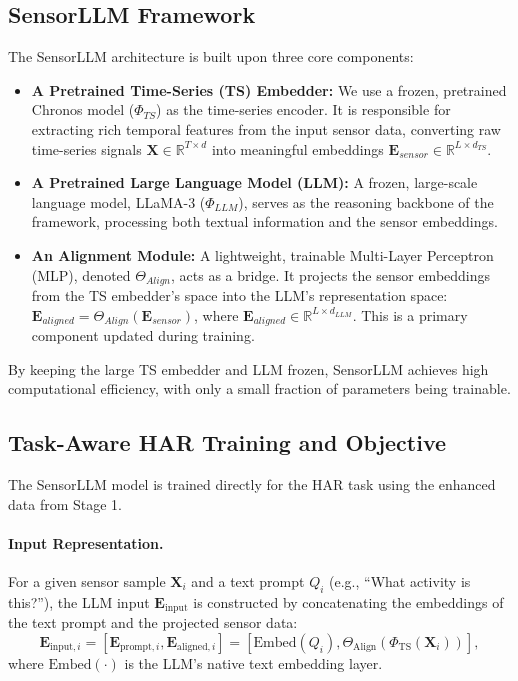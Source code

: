 \subsection{SensorLLM Framework}
\hspace{2em}The SensorLLM architecture is built upon three core components:
\begin{itemize}
    \item \textbf{A Pretrained Time-Series (TS) Embedder:} We use a frozen, pretrained Chronos model ($\Phi_{TS}$) as the time-series encoder. It is responsible for extracting rich temporal features from the input sensor data, converting raw time-series signals $\mathbf{X} \in \mathbb{R}^{T \times d}$ into meaningful embeddings $\mathbf{E}_{sensor} \in \mathbb{R}^{L \times d_{TS}}$.
    \item \textbf{A Pretrained Large Language Model (LLM):} A frozen, large-scale language model, LLaMA-3 ($\Phi_{LLM}$), serves as the reasoning backbone of the framework, processing both textual information and the sensor embeddings.
    \item \textbf{An Alignment Module:} A lightweight, trainable Multi-Layer Perceptron (MLP), denoted $\Theta_{Align}$, acts as a bridge. It projects the sensor embeddings from the TS embedder's space into the LLM's representation space: $\mathbf{E}_{aligned} = \Theta_{Align}(\mathbf{E}_{sensor})$, where $\mathbf{E}_{aligned} \in \mathbb{R}^{L \times d_{LLM}}$. This is a primary component updated during training.
\end{itemize}
By keeping the large TS embedder and LLM frozen, SensorLLM achieves high computational efficiency, with only a small fraction of parameters being trainable.

\subsection{Task-Aware HAR Training and Objective}
\hspace{2em}The SensorLLM model is trained directly for the HAR task using the enhanced data from Stage 1.

\paragraph{Input Representation.} For a given sensor sample $\mathbf{X}_i$ and a text prompt $Q_i$ (e.g., ``What activity is this?''), the LLM input $\mathbf{E}_{\text{input}}$ is constructed by concatenating the embeddings of the text prompt and the projected sensor data:
\[
\mathbf{E}_{\text{input}, i} = [\mathbf{E}_{\text{prompt}, i}, \mathbf{E}_{\text{aligned}, i}] = [\text{Embed}(Q_i), \Theta_{\text{Align}}(\Phi_{\text{TS}}(\mathbf{X}_i))],
\]
where $\text{Embed}(\cdot)$ is the LLM's native text embedding layer.


